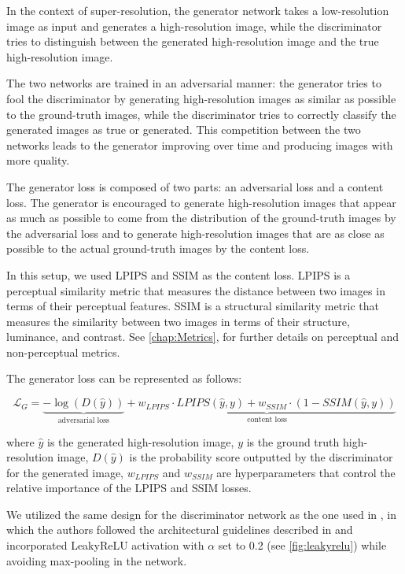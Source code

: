 In the context of super-resolution, the generator network takes a low-resolution image as input and generates a high-resolution image, while the discriminator tries to distinguish between the generated high-resolution image and the true high-resolution image.

The two networks are trained in an adversarial manner: the generator tries to fool the discriminator by generating high-resolution images as similar as possible to the ground-truth images, while the discriminator tries to correctly classify the generated images as true or generated. This competition between the two networks leads to the generator improving over time and producing images with more quality.

The generator loss is composed of two parts: an adversarial loss and a content loss.
The generator is encouraged to generate high-resolution images that appear as much as possible to come from the distribution of the ground-truth images by the adversarial loss and to generate high-resolution images that are as close as possible to the actual ground-truth images by the content loss.

In this setup, we used LPIPS and SSIM as the content loss. LPIPS is a perceptual similarity metric that measures the distance between two images in terms of their perceptual features. SSIM is a structural similarity metric that measures the similarity between two images in terms of their structure, luminance, and contrast. See \cref{chap:Metrics}, for further details on perceptual and non-perceptual metrics. 

The generator loss can be represented as follows:

$$
    \mathcal{L}_{G} = \underset{
        \text{adversarial loss}
    }{\underbrace{
        -\log(D(\hat{y}))
    }} + \underset{
        \text{content loss}
    }{\underbrace{
        w_{LPIPS}\cdot LPIPS(\hat{y}, y) + w_{SSIM} \cdot (1 - SSIM(\hat{y}, y))
    }}
$$

where $\hat{y}$ is the generated high-resolution image, $y$ is the ground truth high-resolution image, $D(\hat{y})$ is the probability score outputted by the discriminator for the generated image, $w_{LPIPS}$ and $w_{SSIM}$ are hyperparameters that control the relative importance of the LPIPS and SSIM losses.

We utilized the same design for the discriminator network as the one used in \cite{ledig2017photo}, in which the authors followed the architectural guidelines described in \cite{radford2015unsupervised} and incorporated LeakyReLU \cite{maas2013rectifier} activation with $\alpha$ set to 0.2 (see \cref{fig:leakyrelu}) while avoiding max-pooling in the network.

